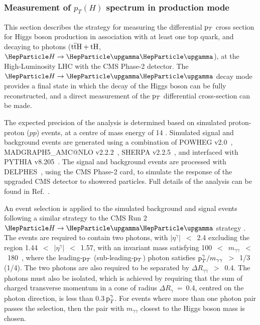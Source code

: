 \subsubsection[N. Wardle, J. Langford]{Measurement of $p_{T}(H)$ spectrum  in \ttH production mode}
\label{sec:ttHdiffxs}

This section describes the strategy for measuring the differential $\mathrm{p}_{T}$ cross section for 
Higgs boson production in association with at least one top quark, and decaying to photons ($\text{t}\overline{\text{t}}\text{H}+\text{tH}$, $\hgg$), 
at the High-Luminosity LHC with the CMS Phase-2 detector. The $\hgg$ decay mode provides a final state in which the decay of the Higgs boson can be fully reconstructed, and a direct measurement of the $\mathrm{p}_{T}$ differential cross-section can be made. 

The expected precision of the analysis is determined based on simulated proton-proton ($pp$) events, at a centre of mass energy of 14 \UTeV.
Simulated signal and background events are generated using a combination of {\sc POWHEG}
v2.0~\cite{Alioli:2010xd,Nason:2009ai}, {\sc MADGRAPH5\_AMC@NLO} v2.2.2~\cite{Alwall:2014hca}, {\sc SHERPA} v2.2.5~\cite{Gleisberg:2008ta}, and interfaced with {\sc PYTHIA} v8.205~\cite{Sjostrand:2007gs}. The signal and background events are processed with {\sc DELPHES}~\cite{deFavereau:2013fsa}, using the CMS Phase-2 card, to simulate the response of the upgraded CMS detector to showered particles. Full details of the analysis can be found in Ref.~\cite{CMS-PAS-FTR-18-020}.


An event selection is applied to the simulated background and signal events following a similar strategy to the CMS Run 2 $\hgg$ strategy \cite{Sirunyan:2018ouh}. The events are required to contain two photons, with $|\eta^\gamma|$~$<$~2.4 excluding the region 1.44~$<$~$|\eta^\gamma|$~$<$~1.57, with an invariant mass satisfying 100~$<$~$m_{\gamma\gamma}$~$<$~180~\UGeV, where the leading-$\mathrm{p}_{T}$ (sub-leading-$\mathrm{p}_{T}$) photon satisfies $\mathrm{p}_{T}^{\gamma}/m_{\gamma\gamma}$~$>$~1/3 (1/4). The two photons are also required to be separated by $\Delta R_{\gamma\gamma}$~$>$~0.4. The photons must also be isolated, which is achieved by requiring that the sum of charged transverse momentum in a cone of radius $\Delta R_{\gamma}$~=~0.4, centred on the photon direction, is less than 0.3$\, \mathrm{p}_{T}^\gamma$. For events where more than one photon pair passes the selection, then the pair with $m_{\gamma\gamma}$ closest to the Higgs boson mass is chosen.

